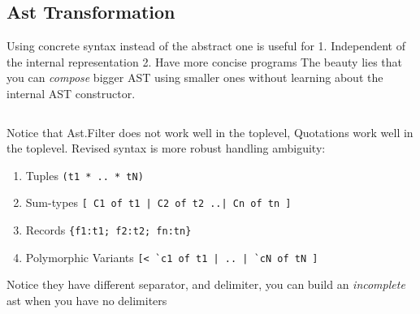  \subsection{Ast Transformation}
  
Using concrete syntax instead of the abstract one is useful for 
1. Independent of the internal representation 
2. Have more concise programs
The beauty lies that you can \textit{compose} bigger AST using smaller ones
without learning about the internal AST constructor.

\inputminted[fontsize=\scriptsize,]{ocaml}{code/camlp4/compose/compose.ml}

Notice that Ast.Filter does not work well in the toplevel, Quotations
work well in the toplevel. Revised syntax is more robust handling
ambiguity:

\begin{enumerate}
  \item  Tuples \verb|(t1 * .. * tN)|
   \item Sum-types \verb/[ C1 of t1 | C2 of t2 ..| Cn of tn ]/
   \item Records  \verb|{f1:t1; f2:t2; fn:tn}|
   \item Polymorphic Variants \verb/[< `c1 of t1 | .. | `cN of tN ]/
\end{enumerate}

Notice they have different separator, and delimiter, you can build an
\textit{incomplete} ast when you have no delimiters

